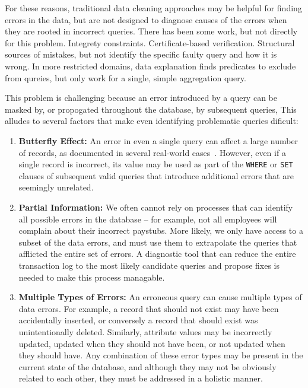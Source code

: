 For these reasons, traditional data cleaning approaches may be helpful for finding errors in the data, but are
not designed to diagnose causes of the errors when they are rooted in incorrect queries.
There has been some work, but not directly for this problem.  
Integrety constraints.
Certificate-based verification.
Structural sources of mistakes, but not identify the specific faulty query and how it is wrong.
In more restricted domains, data explanation finds predicates to exclude from qureies, but only work for a single, simple  aggregation query.

This problem is challenging because an error introduced by a query can be masked by, or propogated throughout the database,
by subsequent queries, This alludes to several factors that make even identifying problematic queries dificult:

\begin{enumerate}[leftmargin=*, topsep=0mm, itemsep=0mm]

  \item {\bf Butterfly Effect: } 
  An error in even a single query can affect a large number of records, as documented in several real-world
  cases~\cite{Yates10, Grady13, sakalerrors}.  However, even if a single record is incorrect,
  its value may be used as part of the \texttt{WHERE} or \texttt{SET} clauses of 
  subsequent valid queries that introduce additional errors that are seemingly unrelated.

  \item {\bf Partial Information:}  We often cannot rely on processes that can identify all possible
  errors in the database -- for example, not all employees will complain about their incorrect paystubs.  
  More likely, we only have access to a subset of the data errors, and must use them to extrapolate 
  the queries that afflicted the entire set of errors.  A diagnostic tool that can reduce
  the entire transaction log to the most likely candidate queries and propose fixes
  is needed to make this process managable.


  \item {\bf Multiple Types of Errors:} 
  An erroneous query can cause multiple types of data errors.  For example, a record that should not exist may have been accidentally inserted, or conversely a record that 
  should exist was unintentionally deleted.  Similarly, attribute values may be incorrectly updated,
  updated when they should not have been, or not updated when they should have.  
  Any combination of these error types may be present in the current state of the database,
  and although they may not be obviously related to each other, they must be addressed in a holistic manner.  

\end{enumerate}


